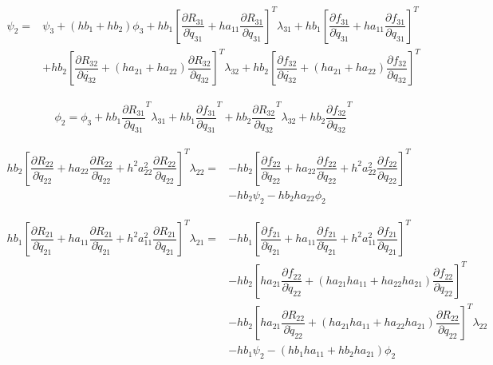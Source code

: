 \documentclass[10pt,letter]{book}
\newcommand{\pd}[2]{\dfrac{\partial #1}{\partial #2}}
\begin{document}
     \begin{equation}
       \begin{split}
          \psi_2 = &  \psi_3 + (hb_1 + hb_2)  \phi_3  + hb_1 \left[ \pd{R_{31}}{\dot{q}_{31}} + ha_{11} \pd{R_{31}}{q_{31}}  \right]^T \lambda_{31} + hb_1 \left[ \pd{f_{31}}{\dot{q}_{31}} + ha_{11} \pd{f_{31}}{{q}_{31}} \right]^T \\
         & + hb_2 \left[ \pd{R_{32}}{\dot{q_{32}}} + (ha_{21} + ha_{22}) \pd{R_{32}}{q_{32}} \right]^T \lambda_{32} + hb_2 \left[ \pd{f_{32}}{\dot{q_{32}}} + (ha_{21} + ha_{22}) \pd{f_{32}}{q_{32}} \right]^T               
       \end{split}
     \end{equation}

     \begin{equation}
       \begin{split}
          \phi_2 =  \phi_3 + hb_1 \pd{R_{31}}{q_{31}}^T \lambda_{31} + hb_1 \pd{f_{31}}{q_{31}}^T  + hb_2 \pd{R_{32}}{q_{32}}^T \lambda_{32} + hb_2 \pd{f_{32}}{q_{32}}^T
       \end{split}
     \end{equation}


     \begin{equation}
       \begin{split}
         hb_2\left[\pd{R_{22}}{\ddot{q}_{22}} + ha_{22}\pd{R_{22}}{\dot{q}_{22}} + h^2a_{22}^2 \pd{R_{22}}{{q}_{22}} \right]^T \lambda_{22} = & - hb_2 \left[\pd{f_{22}}{\ddot{q}_{22}} + ha_{22}\pd{f_{22}}{\dot{q}_{22}} + h^2a_{22}^2 \pd{f_{22}}{{q}_{22}} \right]^T \\ 
         & - hb_2  \psi_2 - hb_2 ha_{22}   \phi_2
       \end{split}
     \end{equation}

     \begin{equation}
       \begin{split}
         hb_1\left[\pd{R_{21}}{\ddot{q}_{21}} + ha_{11}\pd{R_{21}}{\dot{q}_{21}} + h^2a_{11}^2 \pd{R_{21}}{{q}_{21}} \right]^T \lambda_{21} = & - hb_1 \left[\pd{f_{21}}{\ddot{q}_{21}} + ha_{11}\pd{f_{21}}{\dot{q}_{21}} + h^2a_{11}^2 \pd{f_{21}}{{q}_{21}} \right]^T \\ 
         & - hb_2 \left[ha_{21}\pd{f_{22}}{\dot{q}_{22}} + (ha_{21}ha_{11} + ha_{22}ha_{21}) \pd{f_{22}}{{q}_{22}} \right]^T \\
         & - hb_2 \left[ha_{21}\pd{R_{22}}{\dot{q}_{22}} + (ha_{21}ha_{11} + ha_{22}ha_{21}) \pd{R_{22}}{{q}_{22}} \right]^T\lambda_{22} \\
         & - hb_1 \psi_2  - (hb_1ha_{11} + hb_2ha_{21})  \phi_2
       \end{split}
     \end{equation}
\end{document}
